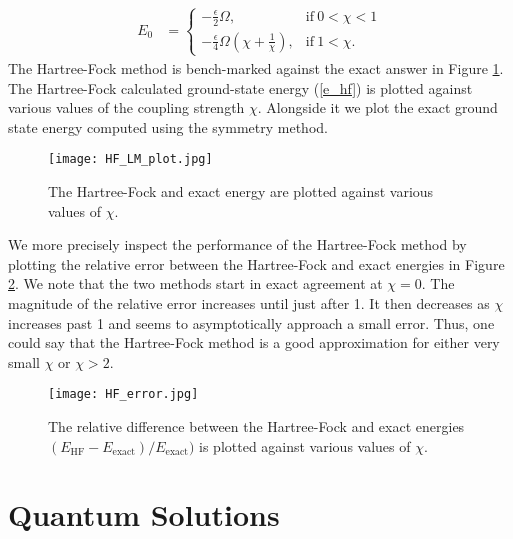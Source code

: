 \documentclass[10pt]{article}
\begin{document}
\begin{align}
\label{e_hf}
E_0
&=
\begin{cases}
-\frac{\epsilon}{2}\Omega, & \text{if} \ 0<\chi<1
\\
-\frac{\epsilon}{4}\Omega\left(\chi+\frac{1}{\chi}\right), & \text{if} \ 1<\chi.
\end{cases}
\end{align}
The Hartree-Fock method is bench-marked against the exact answer in Figure \ref{fig:e0}. The Hartree-Fock calculated ground-state energy (\ref{e_hf}) is plotted against various values of the coupling strength $\chi$. Alongside it we plot the exact ground state energy computed using the symmetry method.
\begin{figure}
    \centering
    \texttt{[image: HF\_LM\_plot.jpg]}
    \caption{The Hartree-Fock and exact energy are plotted against various values of $\chi$.}
    \label{fig:e0}
\end{figure}
We more precisely inspect the performance of the Hartree-Fock method by plotting the relative error between the Hartree-Fock and exact energies in Figure \ref{fig:hfe}. We note that the two methods start in exact agreement at $\chi=0$. The magnitude of the relative error increases until just after 1. It then decreases as $\chi$ increases past 1 and seems to asymptotically approach a small error. Thus, one could say that the Hartree-Fock method is a good approximation for either very small $\chi$ or $\chi>2$.
\begin{figure}
    \centering
    \texttt{[image: HF\_error.jpg]}
    \caption{The relative difference between the Hartree-Fock and exact energies $(E_{\text{HF}}-E_{\text{exact}})/E_{\text{exact}})$ is plotted against various values of $\chi$.}
    \label{fig:hfe}
\end{figure}

\section{Quantum Solutions}
\end{document}
